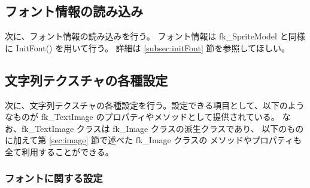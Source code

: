 \subsection{フォント情報の読み込み}
次に、フォント情報の読み込みを行う。
フォント情報は fk\_SpriteModel と同様に InitFont() を用いて行う。
詳細は \ref{subsec:initFont} 節を参照してほしい。

\subsection{文字列テクスチャの各種設定}
次に、文字列テクスチャの各種設定を行う。設定できる項目として、以下のようなものが
fk\_TextImage のプロパティやメソッドとして提供されている。
なお、fk\_TextImage クラスは fk\_Image クラスの派生クラスであり、
以下のものに加えて第 \ref{sec:image} 節で述べた fk\_Image クラスの
メソッドやプロパティも全て利用することができる。

\subsubsection{フォントに関する設定}

